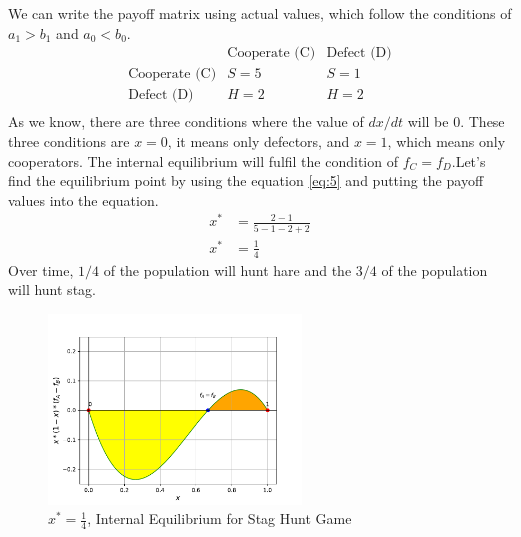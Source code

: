 \documentclass{article}
\begin{document}
We can write the payoff matrix using actual values, which follow the conditions of $a_1>b_1$ and $a_0<b_0$.
\[
\begin{array}{c|cc}
   & \text{Cooperate (C)} & \text{Defect (D)} \\
  \hline
  \text{Cooperate (C)} & S = 5 & S = 1 \\
  \text{Defect (D)} & H = 2 & H = 2 \\
\end{array} \label{eq:6}
\]
As we know, there are three conditions where the value of $dx/dt$ will be $0$. These three conditions are $x=0$, it means only defectors, and $x=1$, which means only cooperators. The internal equilibrium will fulfil the condition of $f_C=f_D$.Let's find the equilibrium point by using the equation \eqref{eq:5} and putting the payoff values into the equation.\\
\begin{align}
x^* &=\frac{2-1}{5-1-2+2} \nonumber\\
x^* &= \frac{1}{4} \nonumber
\end{align}
Over time, $1/4$ of the population will hunt hare and the $3/4$ of the population will hunt stag.
\begin{figure}[H]
    \centering
    \includegraphics[width=0.6\textwidth]{SH.pdf}
    \caption{$x^*=\frac{1}{4}$, Internal Equilibrium for Stag Hunt Game}
    \label{fig:3}
\end{figure}
\end{document}
